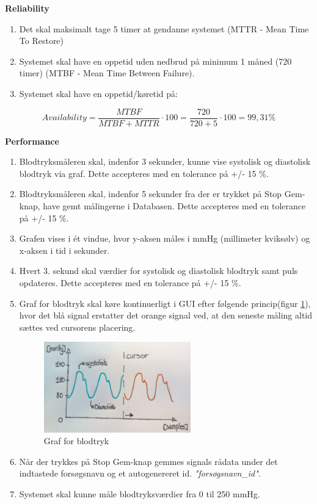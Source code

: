 \textbf{Reliability}
\begin{enumerate}
\item Det skal maksimalt tage 5 timer at gendanne systemet (MTTR - Mean Time To Restore)
\item Systemet skal have en oppetid uden nedbrud på minimum 1 måned (720 timer) (MTBF - Mean Time Between Failure).   
\item Systemet skal have en oppetid/køretid på: 
\end{enumerate}
\begin{ceqn}
\begin{equation}
Availability = \frac{MTBF}{MTBF+MTTR}\cdot100 = \frac{720}{720+5}\cdot100 = 99,31 \%
\end{equation}
\end{ceqn}
					
\textbf{Performance}
\begin{enumerate}
\item Blodtryksmåleren skal, indenfor 3 sekunder, kunne vise systolisk og diastolisk blodtryk via graf. Dette accepteres med en tolerance på +/- 15 \%.
\item Blodtryksmåleren skal, indenfor 5 sekunder fra der er trykket på Stop Gem-knap, have gemt målingerne i Databasen. Dette accepteres med en tolerance på +/- 15 \%.
\item Grafen vises i ét vindue, hvor y-aksen måles i mmHg (millimeter kviksølv) og x-aksen i tid i sekunder. 
\item Hvert 3. sekund skal værdier for systolisk og diastolisk blodtryk samt puls opdateres. Dette accepteres med en tolerance på +/- 15 \%.
\item Graf for blodtryk skal køre kontinuerligt i GUI efter følgende princip(figur \ref{fig:Graf for blodtryks visning}), hvor det blå signal erstatter det orange signal ved, at den seneste måling altid sættes ved cursorens placering.
\begin{figure}[H]
	\centering
	\includegraphics[width=0.6\textwidth]{Figurer/Cursor}
	\caption{Graf for blodtryk}
	\label{fig:Graf for blodtryks visning}
\end{figure}

\item Når der trykkes på Stop Gem-knap gemmes signals rådata under det indtastede forsøgsnavn og et autogenereret id. \textit{"forsøgsnavn\_id"}.
\item Systemet skal kunne måle blodtryksværdier fra 0 til 250 mmHg.
\end{enumerate}


